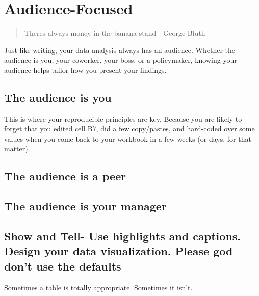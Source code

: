 \documentclass[]{book}
\begin{document}
\hypertarget{audience-focused}{%
\chapter{Audience-Focused}\label{audience-focused}}

\begin{quote}
Theres always money in the banana stand - George Bluth
\end{quote}

Just like writing, your data analysis always has an audience. Whether the audience is you, your coworker, your boss, or a policymaker, knowing your audience helps tailor how you present your findings.

\hypertarget{the-audience-is-you}{%
\section{The audience is you}\label{the-audience-is-you}}

This is where your reproducible principles are key. Because you are likely to forget that you edited cell B7, did a few copy/pastes, and hard-coded over some values when you come back to your workbook in a few weeks (or days, for that matter).

\hypertarget{the-audience-is-a-peer}{%
\section{The audience is a peer}\label{the-audience-is-a-peer}}

\hypertarget{the-audience-is-your-manager}{%
\section{The audience is your manager}\label{the-audience-is-your-manager}}

\hypertarget{show-and-tell--use-highlights-and-captions.-design-your-data-visualization.-please-god-dont-use-the-defaults}{%
\section{Show and Tell- Use highlights and captions. Design your data visualization. Please god don't use the defaults}\label{show-and-tell--use-highlights-and-captions.-design-your-data-visualization.-please-god-dont-use-the-defaults}}

Sometimes a table is totally appropriate. Sometimes it isn't.
\end{document}
